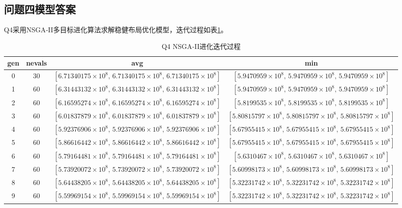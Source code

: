 \documentclass[12pt,a4paper]{article}
\begin{document}
\subsection{问题四模型答案}
Q4采用NSGA‑II多目标进化算法求解稳健布局优化模型，迭代过程如表\ref{tab:q4_iter_log}。

\begin{table}[htbp]
	\centering
	\caption{Q4 NSGA‑II进化迭代过程}
	\label{tab:q4_iter_log}
	\begin{tabular}{cccc}
		\toprule
		gen & nevals & avg & min \\
		\midrule
		0  & 30 & $[6.71340175\times 10^{8},\,6.71340175\times 10^{8},\,6.71340175\times 10^{8}]$ & $[5.9470959\times 10^{8},\,5.9470959\times 10^{8},\,5.9470959\times 10^{8}]$ \\
		1  & 60 & $[6.31443132\times 10^{8},\,6.31443132\times 10^{8},\,6.31443132\times 10^{8}]$ & $[5.9470959\times 10^{8},\,5.9470959\times 10^{8},\,5.9470959\times 10^{8}]$ \\
		2  & 60 & $[6.16595274\times 10^{8},\,6.16595274\times 10^{8},\,6.16595274\times 10^{8}]$ & $[5.8199535\times 10^{8},\,5.8199535\times 10^{8},\,5.8199535\times 10^{8}]$ \\
		3  & 60 & $[6.01837879\times 10^{8},\,6.01837879\times 10^{8},\,6.01837879\times 10^{8}]$ & $[5.80815797\times 10^{8},\,5.80815797\times 10^{8},\,5.80815797\times 10^{8}]$ \\
		4  & 60 & $[5.92376906\times 10^{8},\,5.92376906\times 10^{8},\,5.92376906\times 10^{8}]$ & $[5.67955415\times 10^{8},\,5.67955415\times 10^{8},\,5.67955415\times 10^{8}]$ \\
		5  & 60 & $[5.86616442\times 10^{8},\,5.86616442\times 10^{8},\,5.86616442\times 10^{8}]$ & $[5.67955415\times 10^{8},\,5.67955415\times 10^{8},\,5.67955415\times 10^{8}]$ \\
		6  & 60 & $[5.79164481\times 10^{8},\,5.79164481\times 10^{8},\,5.79164481\times 10^{8}]$ & $[5.6310467\times 10^{8},\,5.6310467\times 10^{8},\,5.6310467\times 10^{8}]$ \\
		7  & 60 & $[5.73920072\times 10^{8},\,5.73920072\times 10^{8},\,5.73920072\times 10^{8}]$ & $[5.60998173\times 10^{8},\,5.60998173\times 10^{8},\,5.60998173\times 10^{8}]$ \\
		8  & 60 & $[5.64438205\times 10^{8},\,5.64438205\times 10^{8},\,5.64438205\times 10^{8}]$ & $[5.32231742\times 10^{8},\,5.32231742\times 10^{8},\,5.32231742\times 10^{8}]$ \\
		9  & 60 & $[5.59969154\times 10^{8},\,5.59969154\times 10^{8},\,5.59969154\times 10^{8}]$ & $[5.32231742\times 10^{8},\,5.32231742\times 10^{8},\,5.32231742\times 10^{8}]$ \\

\end{tabular}
\end{table}
\end{document}
